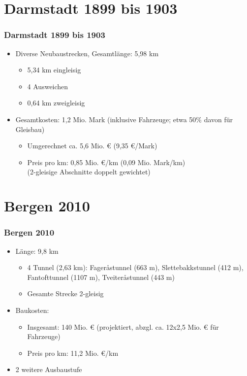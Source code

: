 \documentclass{beamer}
\begin{document}

\section{Darmstadt 1899 bis 1903}
\begin{frame}
  \frametitle{Darmstadt 1899 bis 1903}

  \begin{itemize}
    \item Diverse Neubaustrecken, Gesamtlänge: 5,98 km
      \begin{itemize}
        \item 5,34 km eingleisig
        \item 4 Ausweichen
        \item 0,64 km zweigleisig
      \end{itemize}
    \item Gesamtkosten: 1,2 Mio. Mark (inklusive Fahrzeuge; etwa 50\%
      davon für Gleisbau)
      \begin{itemize}
        \item Umgerechnet ca. 5,6 Mio. € (9,35 €/Mark)
        \item Preis pro km: 0,85 Mio. €/km (0,09 Mio. Mark/km)\\
          (2-gleisige Abschnitte doppelt gewichtet)
      \end{itemize}
  \end{itemize}
\end{frame}


\section{Bergen 2010}
\begin{frame}
  \frametitle{Bergen 2010}

  \begin{itemize}
    \item Länge: 9,8 km
      \begin{itemize}
        \item 4 Tunnel (2,63 km): Fageråstunnel (663 m),
          Slettebakkstunnel (412 m), Fantofttunnel (1107 m), Tveiteråstunnel (443 m)
        \item Gesamte Strecke 2-gleisig
      \end{itemize}
    \item Baukosten:
      \begin{itemize}
        \item Insgesamt: 140 Mio. € (projektiert, abzgl. ca. 12x2,5
          Mio. € für Fahrzeuge)
        \item Preis pro km: 11,2 Mio. €/km
      \end{itemize}
    \item 2 weitere Ausbaustufe
  \end{itemize}
\end{frame}
\end{document}
